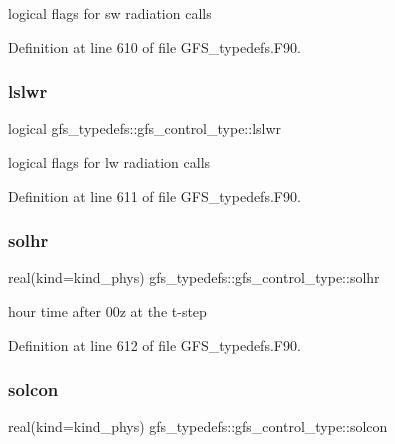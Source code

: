 logical flags for sw radiation calls 



Definition at line 610 of file G\+F\+S\+\_\+typedefs.\+F90.

\mbox{\label{structgfs__typedefs_1_1gfs__control__type_a3d8464c7371771e616df11b6eb378237}} 
\subsubsection{lslwr}
{\footnotesize\ttfamily logical gfs\+\_\+typedefs\+::gfs\+\_\+control\+\_\+type\+::lslwr}



logical flags for lw radiation calls 



Definition at line 611 of file G\+F\+S\+\_\+typedefs.\+F90.

\mbox{\label{structgfs__typedefs_1_1gfs__control__type_a4ccb13a76998bad7a6f6b7e3819b2ce6}} 
\subsubsection{solhr}
{\footnotesize\ttfamily real(kind=kind\+\_\+phys) gfs\+\_\+typedefs\+::gfs\+\_\+control\+\_\+type\+::solhr}



hour time after 00z at the t-\/step 



Definition at line 612 of file G\+F\+S\+\_\+typedefs.\+F90.

\mbox{\label{structgfs__typedefs_1_1gfs__control__type_a667ae7c576d45d2e0697ac5ab45d2f7c}} 
\subsubsection{solcon}
{\footnotesize\ttfamily real(kind=kind\+\_\+phys) gfs\+\_\+typedefs\+::gfs\+\_\+control\+\_\+type\+::solcon}



